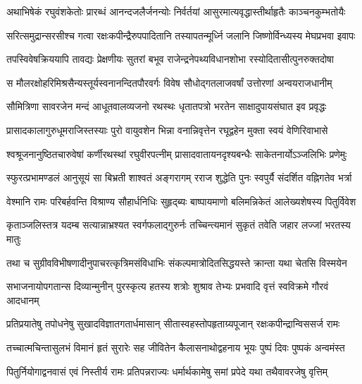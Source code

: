 \twolineshloka
{अथाभिषेकं रघुवंशकेतोः प्रारब्धं आनन्दजलैर्जनन्योः}
{निर्वर्तयां आसुरमात्यवृद्धास्तीर्थाहृतैः काञ्चनकुम्भतोयैः}%

\twolineshloka
{सरित्समुद्रान्सरसीश्च गत्वा रक्षःकपीन्द्रैरुपपादितानि}
{तस्यापतन्मूर्ध्नि जलानि जिष्णोर्विन्ध्यस्य मेघप्रभवा इवापः}%

\twolineshloka
{तपस्विवेषक्रिययापि तावद्यः प्रेक्षणीयः सुतरां बभूव}
{राजेन्द्रनेपथ्यविधानशोभा रस्योदितासीत्पुनरुक्तदोषा}%

\twolineshloka
{स मौलरक्षोहरिमिश्रसैन्यस्तूर्यस्वनानन्दितपौरवर्गः}
{विवेष सौधोद्गतलाजवर्षां उत्तोरणां अन्वयराजधानीम्}%

\twolineshloka
{सौमित्रिणा सावरजेन मन्दं आधूतवालव्यजनो रथस्थः}
{धृतातपत्रो भरतेन साक्षादुपायसंघात इव प्रवृद्धः}%

\twolineshloka
{प्रासादकालागुरुधूमराजिस्तस्याः पुरो वायुवशेन भिन्ना}
{वनान्निवृत्तेन रघूद्वहेन मुक्ता स्वयं वेणिरिवाभासे}%

\twolineshloka
{श्वश्रूजनानुष्ठितचारुवेषां कर्णीरथस्थां रघुवीरपत्नीम्}
{प्रासादवातायनदृश्यबन्धैः साकेतनार्योऽञ्जलिभिः प्रणेमुः}%

\twolineshloka
{स्फुरत्प्रभामण्डलं आनुसूयं सा बिभ्रती शाश्वतं अङ्गरागम्}
{रराज शुद्धेति पुनः स्वपुर्यै संदर्शित वह्निगतेव भर्त्रा}%

\twolineshloka
{वेश्मानि रामः परिबर्हवन्ति विश्राण्य सौहार्धनिधिः सुहृद्ब्यः}
{बाष्पायमाणो बलिमन्निकेतं आलेख्यशेषस्य पितुर्विवेश}%

\twolineshloka
{कृताञ्जलिस्तत्र यदम्ब सत्यान्नाभ्रश्यत स्वर्गफलाद्गुरुर्नः}
{तच्चिन्त्यमानं सुकृतं तवेति जहार लज्जां भरतस्य मातुः}%

\twolineshloka
{तथा च सुग्रीवविभीषणादीनुपाचरत्कृत्रिमसंविधाभिः}
{संकल्पमात्रोदितसिद्धयस्ते क्रान्ता यथा चेतसि विस्मयेन}%

\twolineshloka
{सभाजनायोपगतान्स दिव्यान्मुनीन् पुरस्कृत्य हतस्य शत्रोः}
{शुश्राव तेभ्यः प्रभवादि वृत्तं स्वविक्रमे गौरवं आदधानम्}%

\twolineshloka
{प्रतिप्रयातेषु तपोधनेषु सुखादविज्ञातगतार्धमासान्}
{सीतास्वहस्तोपहृताग्र्यपूजान् रक्षःकपीन्द्रान्विससर्ज रामः}%

\twolineshloka
{तच्चात्मचिन्तासुलभं विमानं हृतं सुरारेः सह जीवितेन}
{कैलासनाथोद्वहनाय भूयः पुष्पं दिवः पुष्पकं अन्वमंस्त}%

\twolineshloka
{पितुर्नियोगाद्वनवासं एवं निस्तीर्य रामः प्रतिपन्नराज्यः}
{धर्मार्थकामेषु समां प्रपेदे यथा तथैवावरजेषु वृत्तिम्}%

